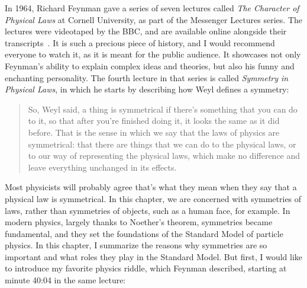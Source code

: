In 1964, Richard Feynman gave a series of seven lectures called \emph{The Character of Physical Laws} at Cornell University, as part of the Messenger Lectures series. The lectures were videotaped by the BBC, and are available online alongside their transcripts~\cite{Feynman1997-vo}. It is such a precious piece of history, and I would recommend everyone to watch it, as it is meant for the public audience. It showcases not only Feynman's ability to explain complex ideas and theories, but also his funny and enchanting personality. The fourth lecture in that series is called \emph{Symmetry in Physical Laws}, in which he starts by describing how Weyl defines a symmetry:

\begin{quote}
So, Weyl said, a thing is symmetrical if there’s something that you can do to it, so that after you’re finished doing it, it looks the same as it did before. That is the sense in which we say that the laws of physics are symmetrical: that there are things that we can do to the physical laws, or to our way of representing the physical laws, which make no difference and leave everything unchanged in its effects.
\end{quote}

Most physicists will probably agree that's what they mean when they say that a physical law is symmetrical. In this chapter, we are concerned with symmetries of laws, rather than symmetries of objects, such as a human face, for example. In modern physics, largely thanks to Noether's theorem, symmetries became fundamental, and they set the foundations of the Standard Model of particle physics. In this chapter, I summarize the reasons why symmetries are so important and what roles they play in the Standard Model. But first, I would like to introduce my favorite physics riddle, which Feynman described, starting at minute 40:04 in the same lecture:

